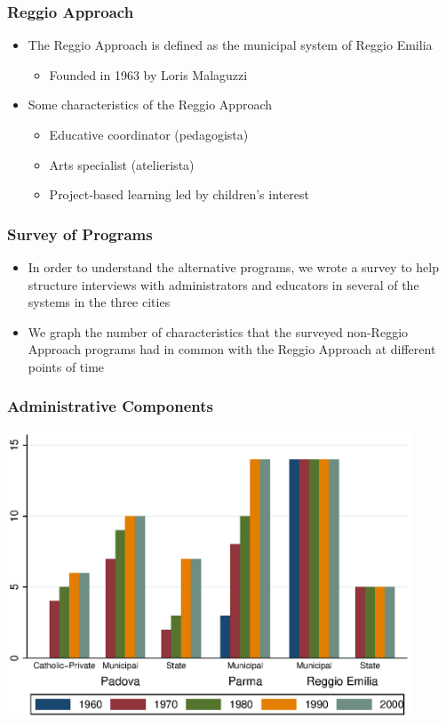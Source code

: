 \documentclass[dynamic]{JJH-Beamer}
\begin{document}
\begin{frame}
\frametitle{Reggio Approach}
\begin{itemize}
	\item The Reggio Approach is defined as the municipal system of Reggio Emilia
	\begin{itemize}
		\item Founded in 1963 by Loris Malaguzzi
	\end{itemize}
	\item Some characteristics of the Reggio Approach
	\begin{itemize}
		\item Educative coordinator (pedagogista)
		\item Arts specialist (atelierista)
		\item Project-based learning led by children's interest 
	\end{itemize}
\end{itemize}
\end{frame}


\begin{frame}
\frametitle{Survey of Programs}
\begin{itemize}
	\item In order to understand the alternative programs, we wrote a survey to help structure interviews with administrators and educators in several of the systems in the three cities
	\item We graph the number of characteristics that the surveyed non-Reggio Approach programs had in common with the Reggio Approach at different points of time
\end{itemize}
\end{frame}

\begin{frame}
\frametitle{Administrative Components}
\includegraphics[width=0.9\textwidth]{../../output/aggregateAdministrative.eps}
\end{frame}
\end{document}
